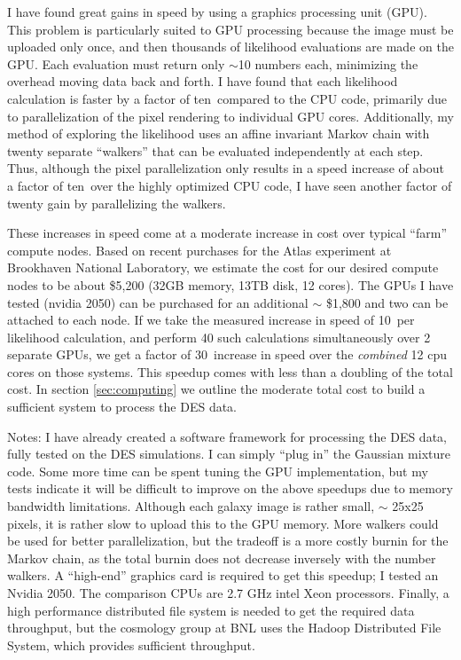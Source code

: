 \documentclass[12pt]{article}
\newcommand{\speedupnum}{10}
\newcommand{\speedup}{ten}
\newcommand{\overallspeedup}{30}
\begin{document}
I have found great gains in speed by using a graphics processing unit (GPU).
This problem is particularly suited to GPU processing because the image must be
uploaded only once, and then thousands of likelihood evaluations are made on
the GPU. Each evaluation must return only $\sim$10 numbers each, minimizing the
overhead moving data back and forth.  I have found that each likelihood
calculation is faster by a factor of \speedup\ compared to the CPU code,
primarily due to parallelization of the pixel rendering to individual GPU
cores.  Additionally, my method of exploring the likelihood uses an affine
invariant Markov chain\cite{GoodmanWeare10} with twenty separate ``walkers''
that can be evaluated independently at each step.  Thus, although the pixel
parallelization only results in a speed increase of about a factor of \speedup\
over the highly optimized CPU code, I have seen another factor of twenty gain
by parallelizing the walkers.  

These increases in speed come at a moderate increase in cost over typical
``farm'' compute nodes.  Based on recent purchases for the Atlas experiment at
Brookhaven National Laboratory, we estimate the cost for our desired compute
nodes to be about \$5,200 (32GB memory, 13TB disk, 12 cores).  The GPUs I have
tested (nvidia 2050) can be purchased for an additional $\sim$ \$1,800 and two
can be attached to each node.  If we take the measured increase in speed of
\speedupnum\ per likelihood calculation, and perform 40 such calculations
simultaneously over 2 separate GPUs, we get a factor of \overallspeedup\
increase in speed over the {\it combined} 12 cpu cores on those systems.  This
speedup comes with less than a doubling of the total cost.  In section
\ref{sec:computing} we outline the moderate total cost to build a sufficient
system to process the DES data.

Notes: I have already created a software framework for processing the DES data,
fully tested on the DES simulations.  I can simply ``plug in'' the Gaussian
mixture code.  Some more time can be spent tuning the GPU implementation, but
my tests indicate it will be difficult to improve on the above speedups due to
memory bandwidth limitations.  Although each galaxy image is rather small,
$\sim$ 25x25 pixels, it is rather slow to upload this to the GPU memory.  More
walkers could be used for better parallelization, but the tradeoff is a more
costly burnin for the Markov chain, as the total burnin does not decrease
inversely with the number walkers.  A ``high-end'' graphics card is required to
get this speedup; I tested an Nvidia 2050. The comparison CPUs are 2.7 GHz
intel Xeon processors.  Finally, a high performance distributed file system is
needed to get the required data throughput, but the cosmology group at BNL uses
the Hadoop Distributed File System, which provides sufficient throughput.
\end{document}
